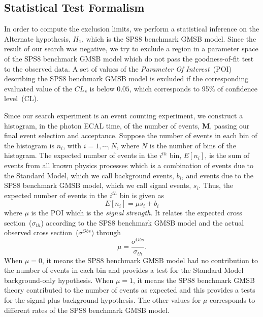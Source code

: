 \subsection{Statistical Test Formalism}
In order to compute the exclusion limits, we perform a statistical inference on the Alternate hypothesis, $H_{1}$, which is the SPS8 benchmark GMSB model. Since the result of our search was negative, we try to exclude a region in a parameter space of the SPS8  benchmark GMSB model which do not pass the goodness-of-fit test to the observed data. A set of values of the \textit{Parameter Of Interest}~(POI) describing the SPS8 benchmark GMSB model is excluded if the corresponding evaluated value of the $CL_{s}$ is below $0.05$, which corresponds to 95\% of confidence level~(CL).
\par 
Since our search experiment is an event counting experiment, we construct a histogram, in the photon ECAL time, of the number of events, $\mathbf{M}$, passing our final event selection and acceptance. Suppose the number of events in each bin of the histogram is $n_{i}$,  with $i = 1, \cdots, N$, where $N$ is the number of bins of the histogram. The expected number of events in the $i^{th}$ bin, $E[n_{i}]$, is the sum of events from all known physics processes which is a combination of events due to the Standard Model, which we  call background events, $b_{i}$, and events due to the  SPS8 benchmark GMSB model, which we call signal events, $s_{i}$. Thus, the expected number of events in the $i^{th}$ bin is given as
\begin{equation}
 E[n_{i}] = \mu s_{i} + b_{i}
\end{equation}
where $\mu$ is the  POI which is the \textit{signal strength}. It relates the expected cross section~($\sigma_{th}$) according to the SPS8  benchmark GMSB model and the actual observed cross section~($\sigma^{Obs}$) through 
\begin{equation}
\mu = \frac{\sigma^{Obs}}{\sigma_{th}}.
\end{equation}
When $\mu = 0$, it means the  SPS8  benchmark GMSB model had no contribution to the number of events in each bin and provides a test for the Standard Model background-only hypothesis. When $\mu=1$, it means the SPS8  benchmark GMSB theory contributed to the number of events as expected and this provides a tests for the signal plus background hypothesis. The other values for $\mu$ corresponds to different rates of the SPS8 benchmark GMSB model.

